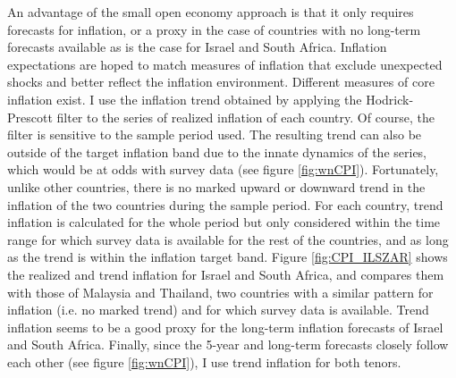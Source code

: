 {An advantage of the small open economy approach is that it only requires forecasts for inflation, or a proxy in the case of countries with no long-term forecasts available as is the case for Israel and South Africa.
Inflation expectations are hoped to match measures of inflation that exclude unexpected shocks and better reflect the inflation environment.
Different measures of core inflation exist.
I use the inflation trend obtained by applying the Hodrick-Prescott filter to the series of realized inflation of each country.
Of course, the filter is sensitive to the sample period used.
The resulting trend can also be outside of the target inflation band due to the innate dynamics of the series, which would be at odds with survey data (see figure \ref{fig:wnCPI}).
Fortunately, unlike other countries, there is no marked upward or downward trend in the inflation of the two countries during the sample period.
For each country, trend inflation is calculated for the whole period but only considered within the time range for which survey data is available for the rest of the countries, and as long as the trend is within the inflation target band.
Figure \ref{fig:CPI_ILSZAR} shows the realized and trend inflation for Israel and South Africa, and compares them with those of Malaysia and Thailand, two countries with a similar pattern for inflation (i.e. no marked trend) and for which survey data is available.
Trend inflation seems to be a good proxy for the long-term inflation forecasts of Israel and South Africa.
Finally, since the 5-year and long-term forecasts closely follow each other (see figure \ref{fig:wnCPI}), I use trend inflation for both tenors.




}
